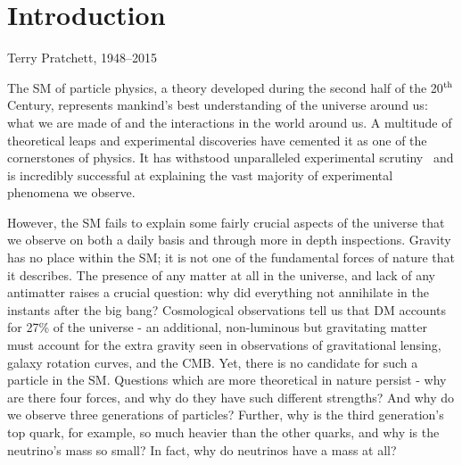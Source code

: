\chapter{Introduction}
\label{chap:intro}



{Terry Pratchett, 1948--2015}

The \ac{SM} of particle physics, a theory developed during the second half of the 20$^{\rm th}$ Century, represents mankind's best understanding of the universe around us: what we are made of and the interactions in the world around us. 
A multitude of theoretical leaps and experimental discoveries have cemented it as one of the cornerstones of physics. 
It has withstood unparalleled experimental scrutiny~\cite{PDG} and is incredibly successful at explaining the vast majority of experimental phenomena we observe.

However, the \ac{SM} fails to explain some fairly crucial aspects of the universe that we observe on both a daily basis and through more in depth inspections. 
Gravity has no place within the \ac{SM}; it is not one of the fundamental forces of nature that it describes. 
The presence of any matter at all in the universe, and lack of any antimatter raises a crucial question: why did everything not annihilate in the instants after the big bang?
Cosmological observations tell us that \ac{DM} accounts for 27\% of the  universe - an additional, non-luminous but gravitating matter must account for the extra gravity seen in observations of gravitational lensing, galaxy rotation curves, and the \ac{CMB}.
Yet, there is no candidate for such a particle in the \ac{SM}. 
Questions which are more theoretical in nature persist - why are there four forces, and why do they have such different strengths? 
And why do we observe three generations of particles? Further, why is the third generation's top quark, for example, so much heavier than the other quarks, and why is the neutrino's mass so small? In fact, why do neutrinos have a mass at all?

